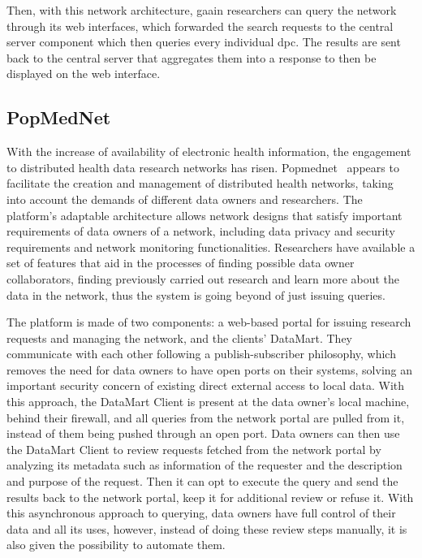 Then, with this network architecture, \gls{gaain} researchers can query the network through its web interfaces, which forwarded the search requests to the central server component which then queries every individual \gls{dpc}.
The results are sent back to the central server that aggregates them into a response to then be displayed on the web interface.

\subsection*{PopMedNet}
With the increase of availability of electronic health information, the engagement to distributed health data research networks has risen.
Popmednet~\cite{popmednet} appears to facilitate the creation and management of distributed health networks, taking into account the demands of different data owners and researchers.
The platform's adaptable architecture allows network designs that satisfy important requirements of data owners of a network, including data privacy and security requirements and network monitoring functionalities.
Researchers have available a set of features that aid in the processes of finding possible data owner collaborators, finding previously carried out research and learn more about the data in the network, thus the system is going beyond of just issuing queries.

The platform is made of two components: a web-based portal for issuing research requests and managing the network, and the clients' DataMart.
They communicate with each other following a publish-subscriber philosophy, which removes the need for data owners to have open ports on their systems, solving an important security concern of existing direct external access to local data.
With this approach, the DataMart Client is present at the data owner's local machine, behind their firewall, and all queries from the network portal are pulled from it, instead of them being pushed through an open port.
Data owners can then use the DataMart Client to review requests fetched from the network portal by analyzing its metadata such as information of the requester and the description and purpose of the request.
Then it can opt to execute the query and send the results back to the network portal, keep it for additional review or refuse it.
With this asynchronous approach to querying, data owners have full control of their data and all its uses, however, instead of doing these review steps manually, it is also given the possibility to automate them.

